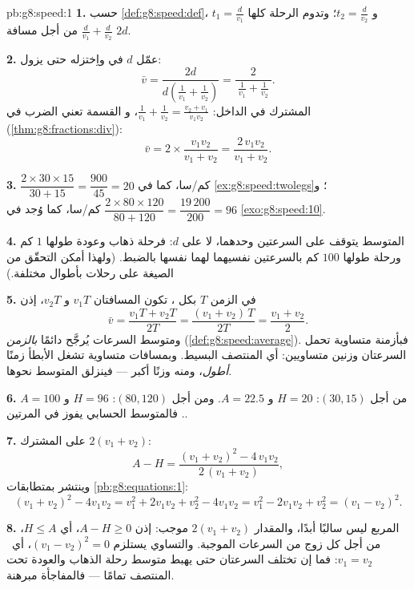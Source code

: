 \begin{solution}{pb:g8:speed:1}
\textbf{1.} حسب \cref{def:g8:speed:def}، $t_1 = \frac{d}{v_1}$ و
$t_2 = \frac{d}{v_2}$؛ وتدوم الرحلة كلها
$\frac{d}{v_1} + \frac{d}{v_2}$ من أجل مسافة $2d$.

\textbf{2.} عمّل $d$ في  واِختزله
حتى يزول:
\[
\bar v
= \frac{2d}{d\left(\frac{1}{v_1} + \frac{1}{v_2}\right)}
= \frac{2}{\ \frac{1}{v_1} + \frac{1}{v_2}\ } .
\]
 المشترك في الداخل:
$\frac{1}{v_1} + \frac{1}{v_2} = \frac{v_2 + v_1}{v_1 v_2}$، و
القسمة تعني الضرب في 
(\cref{thm:g8:fractions:div}):
\[
\bar v = 2 \times \frac{v_1 v_2}{v_1 + v_2}
= \frac{2\, v_1 v_2}{v_1 + v_2} .
\]

\textbf{3.} $\dfrac{2 \times 30 \times 15}{30 + 15}
= \dfrac{900}{45} = 20$ كم/سا، كما في
\cref{ex:g8:speed:twolegs}؛ و
$\dfrac{2 \times 80 \times 120}{80 + 120} = \dfrac{19\,200}{200}
= 96$ كم/سا، كما وُجد في \cref{exo:g8:speed:10}.

\textbf{4.} المتوسط يتوقف على السرعتين وحدهما، لا على
$d$: فرحلة ذهاب وعودة طولها $1$ كم ورحلة طولها $100$ كم بالسرعتين
نفسيهما لهما  نفسها بالضبط. (ولهذا أمكن
التحقّق من الصيغة على رحلات بأطوال مختلفة.)

\textbf{5.} في الزمن $T$ بكل ، تكون المسافتان $v_1 T$
و $v_2 T$، إذن
\[
\bar v = \frac{v_1 T + v_2 T}{2T}
= \frac{(v_1 + v_2)\,T}{2T}
= \frac{v_1 + v_2}{2} .
\]
ومتوسط السرعات يُرجَّح دائمًا \emph{بالزمن}
(\cref{def:g8:speed:average}). فبأزمنة متساوية تحمل السرعتان
وزنين متساويين: أي المنتصف البسيط. وبمسافات متساوية تشغل
 الأبطأ زمنًا \emph{أطول}، ومنه وزنًا أكبر ---
فينزلق المتوسط نحوها.

\textbf{6.} من أجل $(30, 15)$: $H = 20$ و $A = 22.5$. ومن أجل
$(80, 120)$: $H = 96$ و $A = 100$. فالمتوسط الحسابي يفوز
في المرتين.

\textbf{7.} على  المشترك $2(v_1 + v_2)$:
\[
A - H
= \frac{(v_1 + v_2)^2 - 4\, v_1 v_2}{2\,(v_1 + v_2)} ,
\]
وينتشر  بمتطابقات
\cref{pb:g8:equations:1}:
\[
(v_1 + v_2)^2 - 4 v_1 v_2
= v_1^2 + 2 v_1 v_2 + v_2^2 - 4 v_1 v_2
= v_1^2 - 2 v_1 v_2 + v_2^2
= (v_1 - v_2)^2 .
\]

\textbf{8.} المربع ليس سالبًا أبدًا، والمقدار $2(v_1 + v_2)$
موجب: إذن $A - H \geq 0$، أي $H \leq A$، من أجل كل زوج
من السرعات الموجبة. والتساوي يستلزم $(v_1 - v_2)^2 = 0$، أي\
$v_1 = v_2$: فما إن تختلف السرعتان حتى يهبط متوسط
رحلة الذهاب والعودة تحت المنتصف تمامًا --- فالمفاجأة
مبرهنة.


\end{solution}
